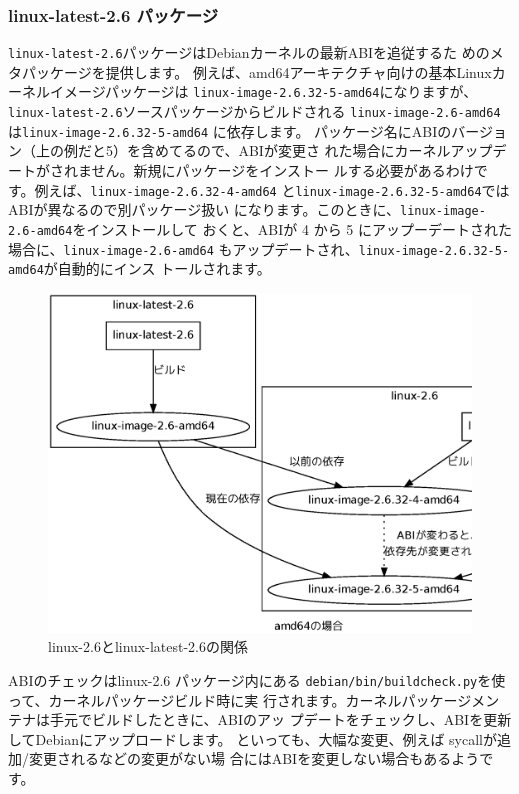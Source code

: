 \documentclass[mingoth,a4paper]{jsarticle}
\begin{document}
\subsubsection{linux-latest-2.6 パッケージ} 

\texttt{linux-latest-2.6}パッケージはDebianカーネルの最新ABIを追従するた
めのメタパッケージを提供します。
例えば、amd64アーキテクチャ向けの基本Linuxカーネルイメージパッケージは
\texttt{linux-image-2.6.32-5-amd64}になりますが、
\texttt{linux-latest-2.6}ソースパッケージからビルドされる
\texttt{linux-image-2.6-amd64}は\texttt{linux-image-2.6.32-5-amd64} に依存します。
パッケージ名にABIのバージョン（上の例だと5）を含めてるので、ABIが変更さ
れた場合にカーネルアップデートがされません。新規にパッケージをインストー
ルする必要があるわけです。例えば、\texttt{linux-image-2.6.32-4-amd64}
と\texttt{linux-image-2.6.32-5-amd64}ではABIが異なるので別パッケージ扱い
になります。このときに、\texttt{linux-image-2.6-amd64}をインストールして
おくと、ABIが 4 から 5 にアップーデートされた場合に、\texttt{linux-image-2.6-amd64}
もアップデートされ、\texttt{linux-image-2.6.32-5-amd64}が自動的にインス
トールされます。

\begin{figure}[H]
\begin{center}
\includegraphics[width=0.8\hsize]{image201005/linux-latest-2.6.eps}
\caption{linux-2.6とlinux-latest-2.6の関係}
\label{fig:linux-latest-2.6}
\end{center}
\end{figure}

ABIのチェックはlinux-2.6 パッケージ内にある
\texttt{debian/bin/buildcheck.py}を使って、カーネルパッケージビルド時に実
行されます。カーネルパッケージメンテナは手元でビルドしたときに、ABIのアッ
プデートをチェックし、ABIを更新してDebianにアップロードします。
といっても、大幅な変更、例えば sycallが追加/変更されるなどの変更がない場
合にはABIを変更しない場合もあるようです。
\end{document}
